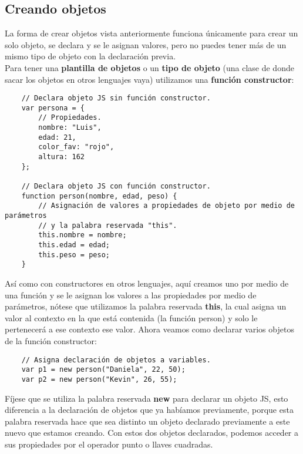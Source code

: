 \subsection{Creando objetos}
\hspace{0.55cm}La forma de crear objetos vista anteriormente funciona únicamente para crear un solo objeto, se declara y se le asignan valores, pero no puedes tener más de un mismo tipo de objeto con la declaración previa.\\
Para tener una \textbf{plantilla de objetos} o un \textbf{tipo de objeto} (una clase de donde sacar los objetos en otros lenguajes vaya) utilizamos una \textbf{función constructor}:
\begin{lstlisting}
    // Declara objeto JS sin función constructor.
    var persona = {
        // Propiedades.
        nombre: "Luis",
        edad: 21,
        color_fav: "rojo",
        altura: 162
    };

    // Declara objeto JS con función constructor.
    function person(nombre, edad, peso) {
        // Asignación de valores a propiedades de objeto por medio de parámetros
        // y la palabra reservada "this".
        this.nombre = nombre;
        this.edad = edad;
        this.peso = peso;
    }
\end{lstlisting}

Así como con constructores en otros lenguajes, aquí creamos uno por medio de una función y se le asignan los valores a las propiedades por medio de parámetros, nótese que utilizamos la palabra reservada \textbf{this}, la cual asigna un valor al contexto en la que está contenida (la función person) y solo le pertenecerá a ese contexto ese valor. Ahora veamos como declarar varios objetos de la función constructor:
\begin{lstlisting}
    // Asigna declaración de objetos a variables.
    var p1 = new person("Daniela", 22, 50);
    var p2 = new person("Kevin", 26, 55);
\end{lstlisting}

Fíjese que se utiliza la palabra reservada \textbf{new} para declarar un objeto JS, esto diferencia a la declaración de objetos que ya habíamos previamente, porque esta palabra reservada hace que sea distinto un objeto declarado previamente a este nuevo que estamos creando. Con estos dos objetos declarados, podemos acceder a sus propiedades por el operador punto o llaves cuadradas.


